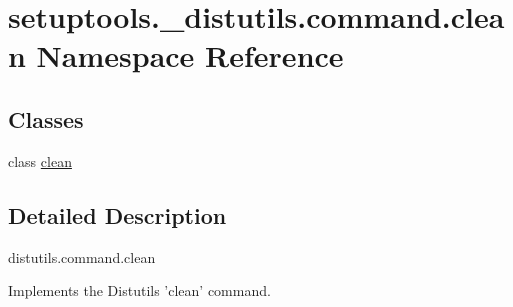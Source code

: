 \hypertarget{namespacesetuptools_1_1__distutils_1_1command_1_1clean}{}\section{setuptools.\+\_\+distutils.\+command.\+clean Namespace Reference}
\label{namespacesetuptools_1_1__distutils_1_1command_1_1clean}
\subsection*{Classes}
\begin{DoxyCompactItemize}
\item 
class \hyperlink{classsetuptools_1_1__distutils_1_1command_1_1clean_1_1clean}{clean}
\end{DoxyCompactItemize}


\subsection{Detailed Description}
\begin{DoxyVerb}distutils.command.clean

Implements the Distutils 'clean' command.\end{DoxyVerb}
 